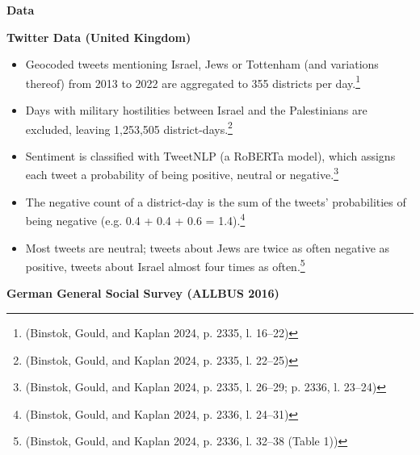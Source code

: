 \par\textbf{Data}\par

\par\textbf{Twitter Data (United Kingdom)}\par

\begin{itemize}
\item
  Geocoded tweets mentioning Israel, Jews or Tottenham (and variations thereof) from 2013 to 2022 are aggregated to 355 districts per day.\footnote{(Binstok, Gould, and Kaplan 2024, p. 2335, l. 16--22)}
\item
  Days with military hostilities between Israel and the Palestinians are excluded, leaving 1,253,505 district-days.\footnote{(Binstok, Gould, and Kaplan 2024, p. 2335, l. 22--25)}
\item
  Sentiment is classified with TweetNLP (a RoBERTa model), which assigns each tweet a probability of being positive, neutral or negative.\footnote{(Binstok, Gould, and Kaplan 2024, p. 2335, l. 26--29; p. 2336, l. 23--24)}
\item
  The negative count of a district-day is the sum of the tweets' probabilities of being negative (e.g. 0.4 + 0.4 + 0.6 = 1.4).\footnote{(Binstok, Gould, and Kaplan 2024, p. 2336, l. 24--31)}
\item
  Most tweets are neutral; tweets about Jews are twice as often negative as positive, tweets about Israel almost four times as often.\footnote{(Binstok, Gould, and Kaplan 2024, p. 2336, l. 32--38 (Table 1))}
\end{itemize}

\par\textbf{German General Social Survey (ALLBUS 2016)}\par

